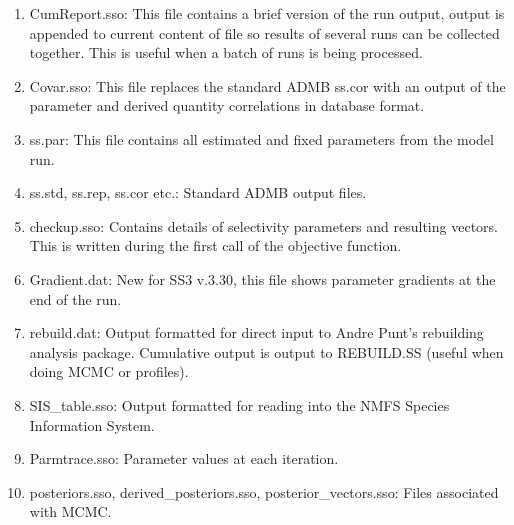 \begin{enumerate}
		\item CumReport.sso: This file contains a brief version of the run output, output is appended to current content of file so results of several runs can be collected together.  This is useful when a batch of runs is being processed.
		\item Covar.sso: This file replaces the standard ADMB ss.cor with an output of the parameter and derived quantity correlations in database format.
		\item ss.par: This file contains all estimated and fixed parameters from the model run. 
		\item ss.std, ss.rep, ss.cor etc.:  Standard ADMB output files.
		\item checkup.sso: Contains details of selectivity parameters and resulting vectors.  This is written during the first call of the objective function.
		\item Gradient.dat: New for SS3 v.3.30, this file shows parameter gradients at the end of the run.
		\item rebuild.dat: Output formatted for direct input to Andre Punt's rebuilding analysis package.  Cumulative output is output to REBUILD.SS (useful when doing MCMC or profiles).
		\item SIS\_table.sso: Output formatted for reading into the NMFS Species Information System.
		\item Parmtrace.sso: Parameter values at each iteration.
		\item posteriors.sso, derived\_posteriors.sso, posterior\_vectors.sso: Files associated with MCMC.
	\end{enumerate}

	
